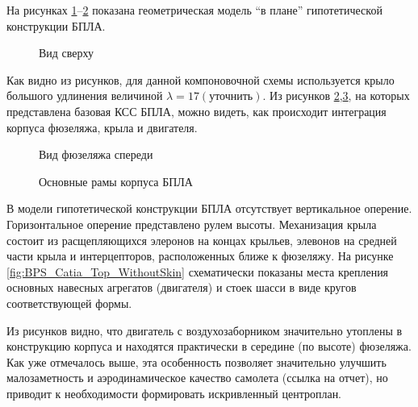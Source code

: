 На рисунках 
\ref{fig:BPS_Catia_Top}--\ref{fig:BPS_Catia_Front} показана геометрическая модель ``в плане'' гипотетической конструкции БПЛА.


\begin{figure}[H]
\centering
\def\svgwidth{0.9\textwidth}

\caption{Вид сверху}
\label{fig:BPS_Catia_Top}
\end{figure}

Как видно из рисунков, для данной компоновочной схемы используется крыло большого удлинения величиной $\lambda = 17 (\text{уточнить})$. Из рисунков \ref{fig:BPS_Catia_Front},\ref{fig:BPS_Catia_WithoutSkin}, на которых представлена базовая КСС БПЛА, можно видеть, как происходит интеграция корпуса фюзеляжа, крыла и двигателя. 

\begin{figure}[H]
\centering

\caption{Вид фюзеляжа спереди}
\label{fig:BPS_Catia_Front}
\end{figure}


\begin{figure}[H]
\centering
\def\svgwidth{0.9\textwidth}

\caption{Основные рамы корпуса БПЛА}
\label{fig:BPS_Catia_WithoutSkin}
\end{figure}

В модели гипотетической конструкции БПЛА отсутствует вертикальное оперение. Горизонтальное оперение представлено рулем высоты. Механизация крыла состоит из расщепляющихся элеронов на концах крыльев, элевонов на средней части крыла и интерцепторов, расположенных ближе к фюзеляжу. На рисунке \ref{fig:BPS_Catia_Top_WithoutSkin} схематически показаны места крепления основных навесных агрегатов (двигателя) и стоек шасси в виде кругов соответствующей формы. 

Из рисунков видно, что двигатель с воздухозаборником значительно утоплены в конструкцию корпуса и находятся практически в середине (по высоте) фюзеляжа. Как уже отмечалось выше, эта особенность позволяет значительно улучшить малозаметность и аэродинамическое качество самолета (ссылка на отчет), но приводит к необходимости формировать искривленный центроплан. 


